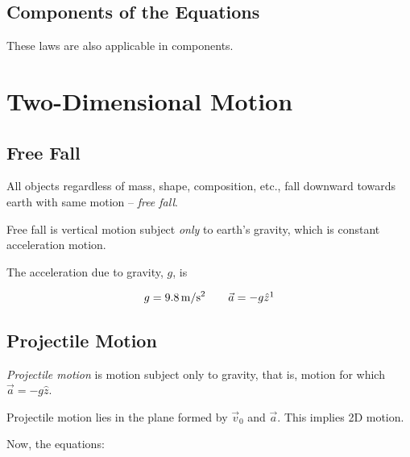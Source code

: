 \subsection{Components of the Equations}

\begin{remark}
	These laws are also applicable in components.
\end{remark}


\section{Two-Dimensional Motion}

\subsection{Free Fall}

All objects regardless of mass, shape, composition, etc., fall downward towards earth with same motion -- \textit{free fall}.

Free fall is vertical motion subject \textit{only} to earth's gravity, which is constant acceleration motion.

The acceleration due to gravity, $g$, is 

\begin{equation}
	g = \SI{9.8}{\m\per\s^2} \qquad \vec a = -g \hat z\footnotemark
\end{equation} 

\subsection{Projectile Motion}

\textit{Projectile motion} is motion subject only to gravity, that is, motion for which $\vec a = -g \hat z$.

\begin{remark}
	Projectile motion lies in the plane formed by $\vec v_0$ and $\vec a$. This implies 2D motion.
\end{remark}

Now, the equations:


